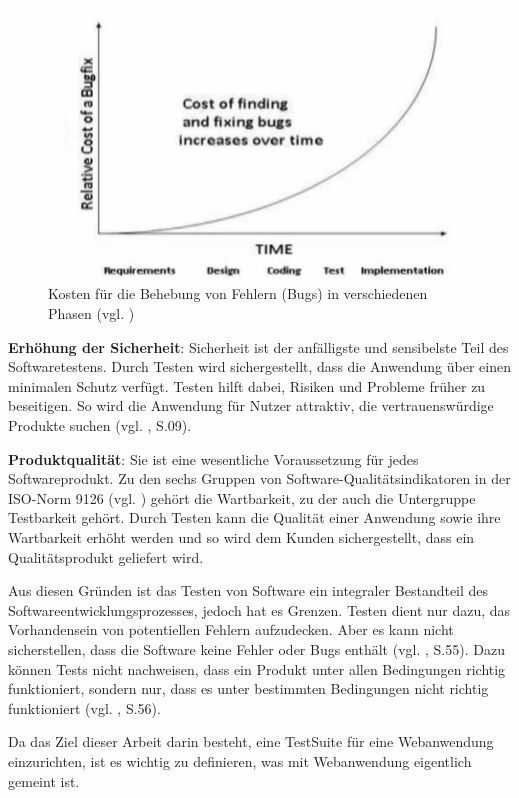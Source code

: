 \begin{figure}[H]
    \centering
    \includegraphics[scale=0.3]{images/Cost-of-fixing-bugs-in-different-phases}
    \caption{Kosten für die Behebung von Fehlern (Bugs) in verschiedenen Phasen (vgl. \cite{kumar2010software})} \label{fig:mof}
\end{figure}


\textbf{Erhöhung der Sicherheit}: Sicherheit ist der anfälligste und
sensibelste Teil des Softwaretestens. Durch Testen wird sichergestellt,
dass die Anwendung über einen minimalen Schutz verfügt. Testen hilft
dabei, Risiken und Probleme früher zu beseitigen. So wird die Anwendung für Nutzer attraktiv,
die vertrauenswürdige Produkte suchen (vgl. \cite{shultz2011software}, S.09).

\textbf{Produktqualität}: Sie ist eine wesentliche
Voraussetzung für jedes Softwareprodukt. Zu den sechs Gruppen von Software-Qualitätsindikatoren
in der ISO-Norm 9126 (vgl. \cite{AlainAbran2010}) gehört die Wartbarkeit, zu der auch die Untergruppe Testbarkeit gehört.
Durch Testen kann die Qualität einer Anwendung sowie ihre Wartbarkeit erhöht werden und so wird dem Kunden sichergestellt,
dass ein Qualitätsprodukt geliefert wird.


Aus diesen Gründen ist das Testen von Software ein
integraler Bestandteil des Softwareentwicklungsprozesses, jedoch hat es Grenzen.
Testen dient nur dazu, das Vorhandensein von potentiellen Fehlern
aufzudecken. Aber es kann nicht sicherstellen, dass
die Software keine Fehler oder Bugs enthält (vgl. \cite{kumar2010software}, S.55).
Dazu können Tests nicht nachweisen, dass ein Produkt unter allen
Bedingungen richtig funktioniert, sondern nur, dass es unter
bestimmten Bedingungen nicht richtig funktioniert (vgl. \cite{kumar2010software}, S.56).



Da das Ziel dieser Arbeit darin besteht, eine \Gls{TestSuite} für
eine Webanwendung einzurichten, ist es wichtig zu
definieren, was mit Webanwendung eigentlich gemeint ist.

